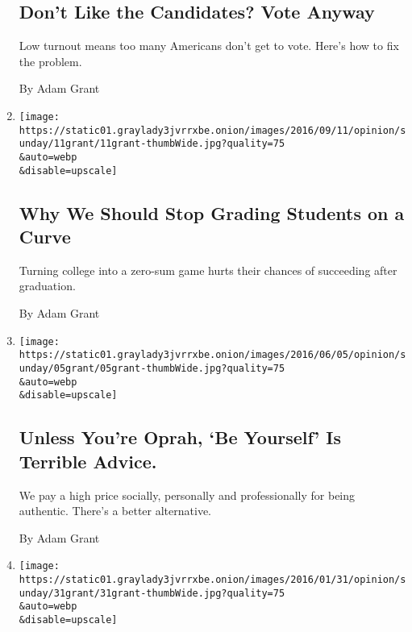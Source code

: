 \begin{enumerate}
{  \subsection{Don't Like the Candidates? Vote
  Anyway}\label{dont-like-the-candidates-vote-anyway}}

  Low turnout means too many Americans don't get to vote. Here's how to
  fix the problem.

  By Adam Grant
\item
  \href{/2016/09/11/opinion/sunday/why-we-should-stop-grading-students-on-a-curve.html}{}

  \texttt{[image: https://static01.graylady3jvrrxbe.onion/images/2016/09/11/opinion/sunday/11grant/11grant-thumbWide.jpg?quality=75\\\&auto=webp\\\&disable=upscale]}

  \hypertarget{why-we-should-stop-grading-students-on-a-curve}{%
  \subsection{Why We Should Stop Grading Students on a
  Curve}\label{why-we-should-stop-grading-students-on-a-curve}}

  Turning college into a zero-sum game hurts their chances of succeeding
  after graduation.

  By Adam Grant
\item
  \href{/2016/06/05/opinion/sunday/unless-youre-oprah-be-yourself-is-terrible-advice.html}{}

  \texttt{[image: https://static01.graylady3jvrrxbe.onion/images/2016/06/05/opinion/sunday/05grant/05grant-thumbWide.jpg?quality=75\\\&auto=webp\\\&disable=upscale]}

  \hypertarget{unless-youre-oprah-be-yourself-is-terrible-advice}{%
  \subsection{Unless You're Oprah, `Be Yourself' Is Terrible
  Advice.}\label{unless-youre-oprah-be-yourself-is-terrible-advice}}

  We pay a high price socially, personally and professionally for being
  authentic. There's a better alternative.

  By Adam Grant
\item
  \href{/2016/01/31/opinion/sunday/how-to-raise-a-creative-child-step-one-back-off.html}{}

  \texttt{[image: https://static01.graylady3jvrrxbe.onion/images/2016/01/31/opinion/sunday/31grant/31grant-thumbWide.jpg?quality=75\\\&auto=webp\\\&disable=upscale]}


\end{enumerate}
